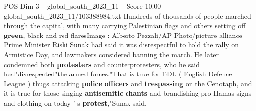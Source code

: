 \begin{textsample}{POS Dim 3 – global\_south\_2023\_11 – Score 10.00 – global\_south\_2023\_11/103388984.txt}
Hundreds of thousands of people marched through the capital, with many carrying Palestinian flags and others setting off \textbf{green}, black and red flaresImage : Alberto Pezzali/AP Photo/picture alliance Prime Minister Rishi Sunak had said it was disrespectful to hold the rally on Armistice Day, and lawmakers considered banning the march.
He later condemned both \textbf{protesters} and counterprotesters, who he said had"disrespected"the armed forces."That is true for EDL ( English Defence League ) thugs attacking \textbf{police} \textbf{officers} and \textbf{trespassing} on the Cenotaph, and it is true for those singing \textbf{antisemitic} \textbf{chants} and brandishing pro-Hamas signs and clothing on today ' s \textbf{protest},"Sunak said.

\end{textsample}
